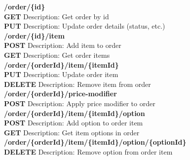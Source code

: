 \documentclass[11pt,a4paper,pdftex]{article}
\begin{document}
\hspace*{1em}\textbf{/order/\{\textbf{id}\}}\\
\hspace*{2em}\textbf{GET} Description: Get order by id\\
\hspace*{2em}\textbf{PUT} Description: Update order details (status, etc.)\\

\hspace*{1em}\textbf{/order/\{\textbf{id}\}/item}\\
\hspace*{2em}\textbf{POST} Description: Add item to order\\
\hspace*{2em}\textbf{GET} Description: Get order items\\

\hspace*{1em}\textbf{/order/\{\textbf{orderId}\}/item/\{\textbf{itemId}\}}\\
\hspace*{2em}\textbf{PUT} Description: Update order item\\
\hspace*{2em}\textbf{DELETE} Description: Remove item from order\\

\hspace*{1em}\textbf{/order/\{\textbf{orderId}\}/price-modifier}\\
\hspace*{2em}\textbf{POST} Description: Apply price modifier to order\\

\hspace*{1em}\textbf{/order/\{\textbf{orderId}\}/item/\{\textbf{itemId}\}/option}\\
\hspace*{2em}\textbf{POST} Description: Add option to order item\\
\hspace*{2em}\textbf{GET} Description: Get item options in order\\

\hspace*{1em}\textbf{/order/\{\textbf{orderId}\}/item/\{\textbf{itemId}\}/option/\{\textbf{optionId}\}}\\
\hspace*{2em}\textbf{DELETE} Description: Remove option from order item\\
\end{document}

